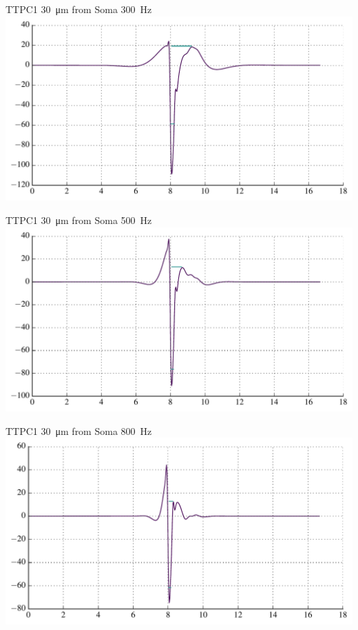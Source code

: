 \documentclass{beamer}
\begin{document}
\begin{frame}{TTPC1 \SI{30}{\micro\metre} from Soma \SI{300}{\hertz} }{}
    \centering
    \includegraphics[width=1.0\textwidth]{images/symfilt300_middle_elec_spike.pdf}
\end{frame}

\begin{frame}{TTPC1 \SI{30}{\micro\metre} from Soma \SI{500}{\hertz} }{}
    \centering
    \includegraphics[width=1.0\textwidth]{images/symfilt500_middle_elec_spike.pdf}
\end{frame}

\begin{frame}{TTPC1 \SI{30}{\micro\metre} from Soma \SI{800}{\hertz} }{}
    \centering
    \includegraphics[width=1.0\textwidth]{images/symfilt800_middle_elec_spike.pdf}
\end{frame}
\end{document}
